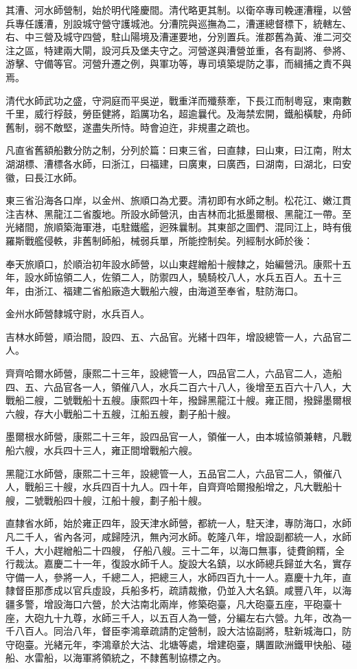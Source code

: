 \begin{pinyinscope}
其漕、河水師營制，始於明代隆慶間。清代略更其制。以衛卒專司輓運漕糧，以營兵專任護漕，別設城守營守護城池。分漕院與巡撫為二，漕運總督標下，統轄左、右、中三營及城守四營，駐山陽境及漕運要地，分別置兵。淮郡舊為黃、淮二河交注之區，特建兩大閘，設河兵及堡夫守之。河營遂與漕營並重，各有副將、參將、游擊、守備等官。河營升遷之例，與軍功等，專司填築堤防之事，而緝捕之責不與焉。

清代水師武功之盛，守洞庭而平吳逆，戰重洋而殲蔡牽，下長江而制粵寇，東南數千里，威行桴鼓，勞臣健將，蹈厲功名，超逾曩代。及海禁宏開，鐵船橫駛，舟師舊制，弱不敵堅，遂盡失所恃。時會迫迕，非規畫之疏也。

凡直省舊額船數分防之制，分列於篇：曰東三省，曰直隸，曰山東，曰江南，附太湖湖標、漕標各水師，曰浙江，曰福建，曰廣東，曰廣西，曰湖南，曰湖北，曰安徽，曰長江水師。

東三省沿海各口岸，以金州、旅順口為尤要。清初即有水師之制。松花江、嫩江貫注吉林、黑龍江二省腹地。所設水師營汛，由吉林而北抵墨爾根、黑龍江一帶。至光緒間，旅順築海軍港，屯駐鐵艦，迥殊曩制。其東部之圖們、混同江上，時有俄羅斯戰艦侵軼，非舊制師船，械弱兵單，所能控制矣。列經制水師於後：

奉天旅順口，於順治初年設水師營，以山東趕繒船十艘隸之，始編營汛。康熙十五年，設水師協領二人，佐領二人，防禦四人，驍騎校八人，水兵五百人。五十三年，由浙江、福建二省船廠造大戰船六艘，由海道至奉省，駐防海口。

金州水師營隸城守尉，水兵百人。

吉林水師營，順治間，設四、五、六品官。光緒十四年，增設總管一人，六品官二人。

齊齊哈爾水師營，康熙二十三年，設總管一人，四品官二人，六品官二人，造船四、五、六品官各一人，領催八人，水兵二百六十八人，後增至五百六十八人，大戰船二艘，二號戰船十五艘。康熙四十年，撥歸黑龍江十艘。雍正間，撥歸墨爾根六艘，存大小戰船二十五艘，江船五艘，劃子船十艘。

墨爾根水師營，康熙二十三年，設四品官一人，領催一人，由本城協領兼轄，凡戰船六艘，水兵四十三人，雍正間增戰船六艘。

黑龍江水師營，康熙二十三年，設總管一人，五品官二人，六品官二人，領催八人，戰船三十艘，水兵四百十九人。四十年，自齊齊哈爾撥船增之，凡大戰船十艘，二號戰船四十艘，江船十艘，劃子船十艘。

直隸省水師，始於雍正四年，設天津水師營，都統一人，駐天津，專防海口，水師凡二千人，省內各河，咸歸陸汛，無內河水師。乾隆八年，增設副都統一人，水師千人，大小趕繒船二十四艘，仔船八艘。三十二年，以海口無事，徒費餉糈，全行裁汰。嘉慶二十一年，復設水師千人。旋設大名鎮，以水師總兵歸並大名，實存守備一人，參將一人，千總二人，把總三人，水師四百九十一人。嘉慶十九年，直隸督臣那彥成以官兵虛設，兵船多朽，疏請裁撤，仍並入大名鎮。咸豐八年，以海疆多警，增設海口六營，於大沽南北兩岸，修築砲臺，凡大砲臺五座，平砲臺十座，大砲九十九尊，水師三千人，以五百人為一營，分編左右六營。九年，改為一千八百人。同治八年，督臣李鴻章疏請酌定營制，設大沽協副將，駐新城海口，防守砲臺。光緒元年，李鴻章於大沽、北塘等處，增建砲臺，購置歐洲鐵甲快船、碰船、水雷船，以海軍將領統之，不隸舊制協標之內。


\end{pinyinscope}
